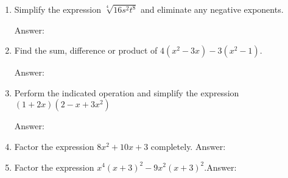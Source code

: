 \documentclass[11pt]{article}
\begin{document}
\begin{enumerate}
\item Simplify the expression $\sqrt[4]{16s^2t^8}$ and eliminate any negative exponents.\\
\begin{flushright}{Answer: \underline{\hspace{2in}}}\end{flushright}

\vfill

\item Find the sum, difference or product of  $ 4(x^2-3x)-3(x^2-1).$\\
 \begin{flushright}{Answer: \underline{\hspace{2in}}}\end{flushright}
 
\vfill

\item Perform the indicated operation and simplify the expression $(1+2x)(2-x+3x^2)$\\
\begin{flushright}{Answer: \underline{\hspace{2in}}}\end{flushright}

\vfill

\item Factor the expression $8x^2+10x+3$ completely. \hfill Answer: \underline{\hspace{2in}}\\
\vfill

\item Factor the expression $x^4(x+3)^2-9x^2(x+3)^2.$\hfill Answer: \underline{\hspace{2in}}\\
\vfill



\end{enumerate}
\end{document}
